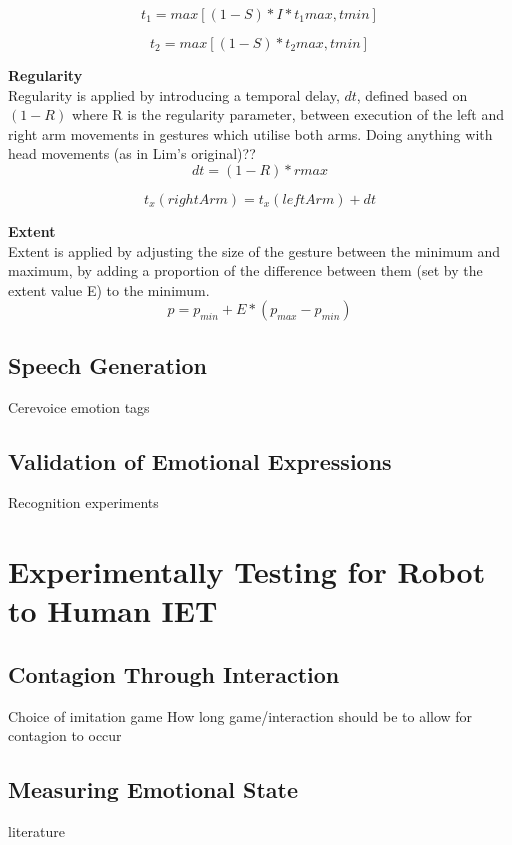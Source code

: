 \documentclass[11pt,a4paper]{report}
\begin{document}
\begin{equation}
t_{1} = max[(1-S)*I*t_{1}max,tmin]
\end{equation}

\begin{equation}
t_{2} = max[(1-S)*t_{2}max,tmin]
\end{equation}

\textbf{Regularity}
\\ Regularity is applied by introducing a temporal delay, $dt$, defined based on $(1-R)$ where R is the regularity parameter, between execution of the left and right arm movements in gestures which utilise both arms. Doing anything with head movements (as in Lim's original)??
\begin{equation}
dt = (1-R)*rmax
\end{equation}

\begin{equation}
t_{x}(rightArm) = t_{x}(leftArm) + dt
\end{equation}

\textbf{Extent}
\\Extent is applied by adjusting the size of the gesture between the minimum and maximum, by adding a proportion of the difference between them (set by the extent value E) to the minimum. 
\begin{equation}
p = p_{min} + E*(p_{max} - p_{min})
\end{equation}

\subsection{Speech Generation}
Cerevoice emotion tags

\subsection{Validation of Emotional Expressions}
Recognition experiments

\section{Experimentally Testing for Robot to Human IET}
\subsection{Contagion Through Interaction}
Choice of imitation game
How long game/interaction should be to allow for contagion to occur
\subsection{Measuring Emotional State}
literature
\end{document}
